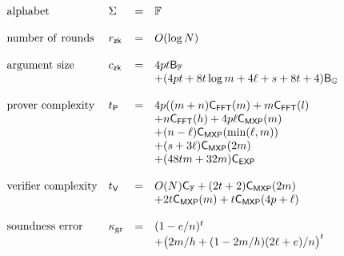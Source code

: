 \begin{comment}
\section{Performance Evaluation}\label{sec:performancecompare}
We now summarize several performance parameters attained by our protocol for circuit
size $N$ and soundness $2^{-\secpar}$. Let $N=pms$, $\ell=s+t$ and $h$ be as in
previous sections. Let $\cfop$ denote the time taken for a field operation,
$\cfft(x)$ denote the time to compute $\fft$ of a length $x$ vector, $\cmexp(x)$
denote the time taken for a multiexponentiation of length $x$, and $\cexp$
denote the time required for an exponentiation. Let $\bitsF$ and $\bitsG$ denote
the number of bits required to represent an element of $\FF$ and $\GG$
respectively. Our protocol $\name$ achieves
following efficiency parameters:
>>>>>>> 23d366f2e2ed1d9aa1e813a97eaeee4f95db57a1
\end{comment}
{\footnotesize
\begin{align*}
\begin{array}{llrl}
\mathrm{alphabet} & \Sigma & = & \mathbb{F} \\
& & & \\
\mathrm{number\ of\ rounds} & r_\mathsf{zk} & = & O(\log{N}) \\
& & & \\
\mathrm{argument\ size} & c_\mathsf{zk} & = & 4pt\mathsf{B}_\mathbb{F} \\
& & & +(4pt+8t\log{m}+4\ell+s+8t+4)\mathsf{B}_\mathbb{G} \\
& & & \\
\mathrm{prover\ complexity} & t_{\mathsf{P}} & = &
4p((m+n)\mathsf{C}_\mathsf{FFT}(m)+m\mathsf{C}_\mathsf{FFT}(l) \\
& & &+n\mathsf{C}_\mathsf{FFT}(h) + 4p\ell\mathsf{C}_\mathsf{MXP}(m)\\
& & &+(n-\ell)\mathsf{C}_\mathsf{MXP}(\min(\ell,m))\\
& & & +(s+3\ell)\mathsf{C}_\mathsf{MXP}(2m)\\
& & &+ (48tm+32m)\mathsf{C}_\mathsf{EXP} \\
& & & \\
\mathrm{verifier\ complexity} & t_{\mathsf{V}} & = &
O(N)\mathsf{C}_\mathbb{F} + (2t+2)\mathsf{C}_\mathsf{MXP}(2m)\\
& & & +2t\mathsf{C}_\mathsf{MXP}(m)+t\mathsf{C}_\mathsf{MXP}(4p+\ell) \\
& & & \\
\mathrm{soundness\ error} & \kappa_{\rm gr} & = & (1-e/n)^t \\ 
& & & +\big(2m/h+(1-2m/h)(2\ell+e)/n\big)^t 
\end{array}
\end{align*}
}

